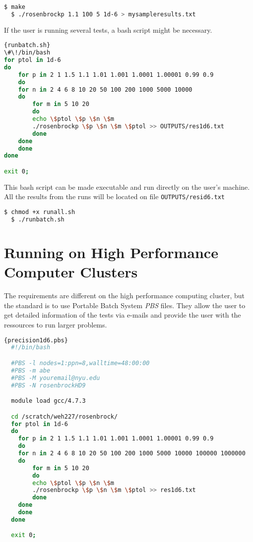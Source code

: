 \begin{lstlisting}[language=bash]
  $ make
  $ ./rosenbrockp 1.1 100 5 1d-6 > mysampleresults.txt
\end{lstlisting}

If the user is running several tests, a bash script might be necessary.

\begin{lstlisting}[language=bash]{runbatch.sh}
\#\!/bin/bash
for ptol in 1d-6
do
    for p in 2 1 1.5 1.1 1.01 1.001 1.0001 1.00001 0.99 0.9
    do
	for n in 2 4 6 8 10 20 50 100 200 1000 5000 10000
	do
	    for m in 5 10 20
	    do
		echo \$ptol \$p \$n \$m
		./rosenbrockp \$p \$n \$m \$ptol >> OUTPUTS/res1d6.txt
	    done
	done
    done
done

exit 0;
\end{lstlisting}

This bash script can be made executable and run directly on the user's machine. All the results from the runs will be located on file \texttt{OUTPUTS/resid6.txt}

\begin{lstlisting}[language=bash]
  $ chmod +x runall.sh
  $ ./runbatch.sh
\end{lstlisting}

\section{Running on High Performance Computer Clusters}

The requirements are different on the high performance computing cluster, but the standard is to use Portable Batch System \emph{PBS} files. They allow the user to get detailed information of the tests via e-mails and provide the user with the ressources to run larger problems.

\begin{lstlisting}[language=bash]{precision1d6.pbs}
  #!/bin/bash

  #PBS -l nodes=1:ppn=8,walltime=48:00:00
  #PBS -m abe
  #PBS -M youremail@nyu.edu
  #PBS -N rosenbrockHD9

  module load gcc/4.7.3

  cd /scratch/weh227/rosenbrock/
  for ptol in 1d-6
  do
    for p in 2 1 1.5 1.1 1.01 1.001 1.0001 1.00001 0.99 0.9
    do
	for n in 2 4 6 8 10 20 50 100 200 1000 5000 10000 100000 1000000
	do
	    for m in 5 10 20
	    do
		echo \$ptol \$p \$n \$m
		./rosenbrockp \$p \$n \$m \$ptol >> res1d6.txt
	    done
	done
    done
  done

  exit 0;
\end{lstlisting}

